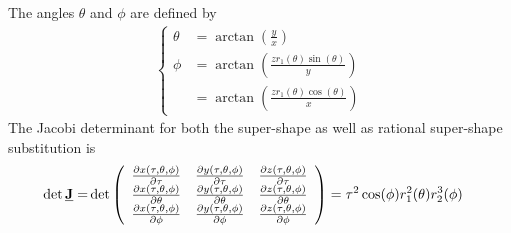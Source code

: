 The angles $\theta$ and $\phi$ are defined by
\begin{align}\label{eq:SuperShapesThetaPhi}
  \begin{cases}
    \theta & = \arctan\left(\frac{y}{x}\right) \\
    \phi   & = \arctan\left(\frac{zr_1(\theta)\sin(\theta)}{y}\right) \\
           & = \arctan\left(\frac{zr_1(\theta)\cos(\theta)}{x}\right)
  \end{cases}
\end{align}
The Jacobi determinant for both the super-shape as well as rational super-shape substitution is
\begin{align}\label{eq:detJ_supershapes}
\det{\M{J}} = &\det
  \left(
    \begin{array}{ccc}
         \frac{\partial x(\tau,\theta,\phi)}{\partial \tau}
       & \frac{\partial y(\tau,\theta,\phi)}{\partial \tau}
       & \frac{\partial z(\tau,\theta,\phi)}{\partial \tau}\\
         \frac{\partial x(\tau,\theta,\phi)}{\partial \theta}
       & \frac{\partial y(\tau,\theta,\phi)}{\partial \theta}
       & \frac{\partial z(\tau,\theta,\phi)}{\partial \theta} \\
         \frac{\partial x(\tau,\theta,\phi)}{\partial \phi}
       & \frac{\partial y(\tau,\theta,\phi)}{\partial \phi}
       & \frac{\partial z(\tau,\theta,\phi)}{\partial \phi}
    \end{array}
  \right)   =
  \tau^2 \cos (\phi ) r_1^2(\theta) r_2^3(\phi)
\end{align}

